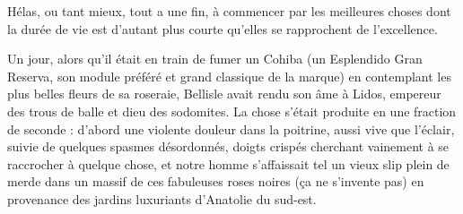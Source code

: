 Hélas, ou tant mieux, tout a une fin, à commencer par les meilleures choses dont la durée de vie est d’autant plus courte qu’elles se rapprochent de l’excellence.

%
%
Un jour, alors qu’il était en train de fumer un Cohiba (un Esplendido Gran Reserva, son module préféré et grand classique de la marque) en contemplant les plus belles fleurs de sa roseraie, Bellisle avait rendu son âme à Lidos, empereur des trous de balle et dieu des sodomites. La chose s’était produite en une fraction de seconde : d’abord une violente douleur dans la poitrine, aussi vive que l’éclair, suivie de quelques spasmes désordonnés, doigts crispés cherchant vainement à se raccrocher à quelque chose, et notre homme s’affaissait tel un vieux slip plein de merde dans un massif de ces fabuleuses roses noires (ça ne s’invente pas) en provenance des jardins luxuriants d’Anatolie du sud-est.

